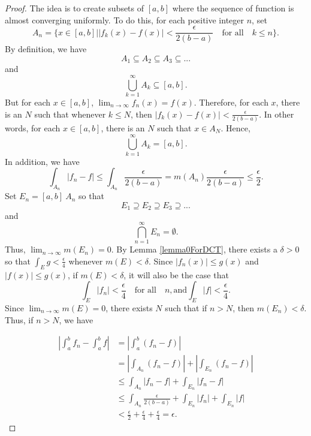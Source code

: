 \documentclass[12pt]{amsart}
\theoremstyle{plain}
\theoremstyle{definition}
\theoremstyle{remark}
\numberwithin{equation}{section}
\numberwithin{thm}{section}
\begin{document}
\begin{proof}
    The idea is to create subsets of $[a,b]$ where the sequence of function is almost converging uniformly. To do this, for each positive integer $n$, set 
    \begin{equation*}
        A_n = \{ x \in [a,b] | |f_k(x)-f(x)| < \frac{\epsilon}{2(b-a)} \quad \text{for all} \quad k \leq n \}.
    \end{equation*}
    By definition, we have
    \begin{equation*}
        A_1 \subseteq A_2 \subseteq A_3 \subseteq ...
    \end{equation*}
    and
    \begin{equation*}
        \bigcup_{k=1}^{\infty} A_k \subseteq [a,b].
    \end{equation*}
    But for each $x \in [a,b]$, $\lim_{n \to \infty} f_n(x) = f(x)$. Therefore, for each $x$, there is an $N$ such that whenever $k\leq N$, then $|f_k(x)-f(x)| < \frac{\epsilon}{2(b-a)}$. In other words, for each $x \in [a,b]$, there is an $N$ such that $x \in A_N.$ Hence,
    \begin{equation*}
        \bigcup_{k=1}^\infty A_k = [a,b].
    \end{equation*}
    In addition, we have
    \begin{equation*}
        \int_{A_n} |f_n -f| \leq \int_{A_n} \frac{\epsilon}{2(b-a)} = m(A_n)\frac{\epsilon}{2(b-a)} \leq \frac{\epsilon}{2}.
    \end{equation*}
    Set $E_n = [a,b] \ A_n$ so that 
    \begin{equation*}
        E_1 \supseteq E_2 \supseteq E_3 \supseteq ...
    \end{equation*}
    and 
    \begin{equation*}
        \bigcap_{n=1}^\infty E_n =\emptyset.
    \end{equation*}
    Thus, $\lim_{n \to \infty} m(E_n) =0$.
    By Lemma \ref{lemma0ForDCT}, there exists a $\delta>0$ so that $\int_E g < \frac{\epsilon}{4}$ whenever $m(E) < \delta$. Since $|f_n(x)|\leq g(x)$ and $|f(x)| \leq g(x)$, if $m(E) < \delta$, it will also be the case that
    \begin{equation*}
        \int_E |f_n| < \frac{\epsilon}{4} \quad \text{for all} \quad n, \text{and} \int_E |f|<\frac{\epsilon}{4}.
    \end{equation*}
    Since $\lim_{n \to \infty} m(E) =0$, there exists $N$ such that if $n > N$, then $m(E_n) < \delta$. Thus, if $n>N$, we have

\begin{equation*}
    \begin{aligned}
        |\int_a^b f_n -\int_a^b f | &= |\int_a^b (f_n -f) | \\
        &= |\int_{A_n} (f_n -f ) | + |\int_{E_n} (f_n -f ) | \\
        &\leq \int_{A_n}|f_n-f| + \int_{E_n}|f_n-f| \\
        &\leq \int_{A_n}\frac{\epsilon}{2(b-a)} + \int_{E_n}|f_n| + \int_{E_n} |f| \\
        & < \frac{\epsilon}{2} + \frac{\epsilon}{4} + \frac{\epsilon}{4} = \epsilon.
    \end{aligned} 
\end{equation*}
    

\end{proof}
\end{document}
